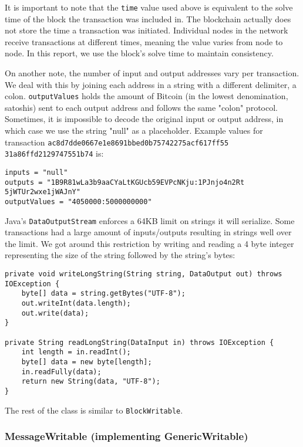 \documentclass[9pt,twocolumn,twoside]{idsi}
\begin{document}
It is important to note that the \lstinline{time} value used above is equivalent to the solve time of the block the transaction was included in. The blockchain actually does not store the time a transaction was initiated. Individual nodes in the network receive transactions at different times, meaning the value varies from node to node. In this report, we use the block's solve time to maintain consistency.

On another note, the number of input and output addresses vary per transaction. We deal with this by joining each address in a string with a different delimiter, a colon. \lstinline{outputValues} holds the amount of Bitcoin (in the lowest denomination, satoshis) sent to each output address and follows the same "colon" protocol. Sometimes, it is impossible to decode the original input or output address, in which case we use the string "null" as a placeholder. Example values for transaction \lstinline{ac8d7dde0667e1e8691bbed0b75742275acf617ff55} \lstinline{31a86ffd2129747551b74} is:

\begin{lstlisting}
inputs = "null"
outputs = "1B9R81wLa3b9aaCYaLtKGUcb59EVPcNKju:1PJnjo4n2Rt
5jWTUr2wxe1jWAJnY"
outputValues = "4050000:5000000000"
\end{lstlisting}

Java's \lstinline{DataOutputStream} enforces a 64KB limit on strings it will serialize. Some transactions had a large amount of inputs/outputs resulting in strings well over the limit. We got around this restriction by writing and reading a 4 byte integer representing the size of the string followed by the string's bytes:

\begin{lstlisting}
private void writeLongString(String string, DataOutput out) throws IOException {
    byte[] data = string.getBytes("UTF-8");
    out.writeInt(data.length);
    out.write(data);
}

private String readLongString(DataInput in) throws IOException {
    int length = in.readInt();
    byte[] data = new byte[length];
    in.readFully(data);
    return new String(data, "UTF-8");
}
\end{lstlisting}

The rest of the class is similar to \lstinline{BlockWritable}.

\subsubsection{MessageWritable (implementing GenericWritable)}
\end{document}
